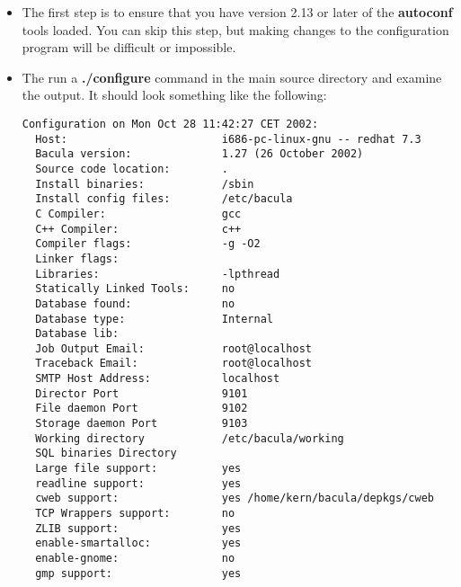 \begin{itemize}
\item The first step is to ensure that you have version 2.13 or later  of the
   {\bf autoconf} tools loaded. You can skip this step, but  making changes to
   the configuration program will be difficult or  impossible.
\item The run a {\bf ./configure} command in the main source directory  and
   examine the output. It should look something like the  following:

\footnotesize
\begin{verbatim}
Configuration on Mon Oct 28 11:42:27 CET 2002:
  Host:                        i686-pc-linux-gnu -- redhat 7.3
  Bacula version:              1.27 (26 October 2002)
  Source code location:        .
  Install binaries:            /sbin
  Install config files:        /etc/bacula
  C Compiler:                  gcc
  C++ Compiler:                c++
  Compiler flags:              -g -O2
  Linker flags:
  Libraries:                   -lpthread
  Statically Linked Tools:     no
  Database found:              no
  Database type:               Internal
  Database lib:
  Job Output Email:            root@localhost
  Traceback Email:             root@localhost
  SMTP Host Address:           localhost
  Director Port                9101
  File daemon Port             9102
  Storage daemon Port          9103
  Working directory            /etc/bacula/working
  SQL binaries Directory
  Large file support:          yes
  readline support:            yes
  cweb support:                yes /home/kern/bacula/depkgs/cweb
  TCP Wrappers support:        no
  ZLIB support:                yes
  enable-smartalloc:           yes
  enable-gnome:                no
  gmp support:                 yes
\end{verbatim}
\normalsize


\end{itemize}
